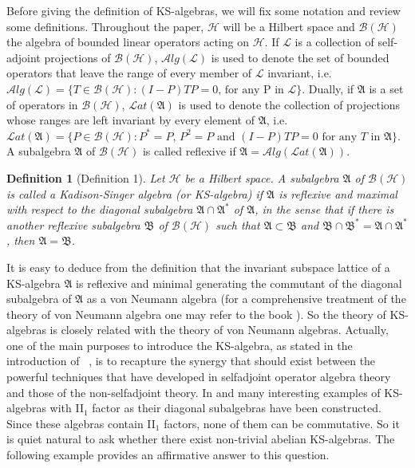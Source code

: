 \documentclass[a4paper,10pt]{amsart}
\newtheorem{definition}{Definition}[section]
\theoremstyle{refs}
\newcommand{\AAA}{\mathfrak A}
\newcommand{\BBB}{\mathcal B}
\newcommand{\HHH}{\mathcal H} %
\newcommand{\LLL}{\mathcal L} %
\newcommand{\Lat}{\mathcal Lat}
\newcommand{\Alg}{\mathcal Alg}
\begin{document}
Before giving the definition of KS-algebras, we will fix some notation
and review some definitions. Throughout the paper, $\HHH$ will
be a Hilbert space and $\BBB(\HHH)$
the algebra of bounded linear operators acting on $\HHH$. If $\LLL$ is
a collection of self-adjoint projections of $\BBB(\HHH)$,
$\Alg(\LLL)$ is used to denote the set of bounded operators
that leave the range of every member of $\LLL$ invariant,
i.e. $\Alg(\LLL) = \{ T \in \BBB(\HHH) : (I-P)TP = 0 \mbox{, for any P in } \LLL
\}$. Dually, if $\AAA$ is a set of operators in $\BBB(\HHH)$, $\Lat(\AAA)$
is used to denote the collection of projections whose ranges are left invariant
by every element of $\AAA$, i.e. $\Lat(\AAA) = \{ P \in \BBB(\HHH) :
P^* = P \mbox{, } P^2 = P \mbox{ and } (I-P)TP = 0 \mbox{ for any $T$ in $\AAA$} \}$.
A subalgebra $\AAA$ of $\BBB(\HHH)$ is called reflexive
if $\AAA = \Alg(\Lat(\AAA))$.

\begin{definition}[Definition 1\cite{GY1}] \label{def1}
Let $\HHH$ be a Hilbert space. A subalgebra $\AAA$ of $\BBB(\HHH)$ is called a Kadison-Singer
algebra (or
KS-algebra) if $\AAA$ is reflexive and maximal with respect to the diagonal
subalgebra $\AAA \cap \AAA^{*}$ of $\AAA$, in the sense that if there is another
reflexive subalgebra $\mathfrak{B}$ of $\BBB(\HHH)$ such that $\AAA \subset
\mathfrak{B}$ and $\mathfrak{B} \cap
\mathfrak{B}^{*}=\mathfrak{A}\cap\mathfrak{A}^*$, then $\AAA =
\mathfrak{B}$.
\end{definition}

It is easy to deduce from the definition that the invariant subspace
lattice of a KS-algebra $\AAA$ is reflexive and minimal generating the
commutant of the diagonal subalgebra of $\AAA$ as a von Neumann algebra
(for a comprehensive treatment of the theory of von Neumann algebra
one may refer to
the book \cite{Ka}). So the
theory of KS-algebras is closely related with the theory of von Neumann
algebras. Actually, one of the main purposes to introduce the
KS-algebra, as stated in the introduction of
~\cite{GY1}, is to recapture the synergy that should exist between the powerful
techniques that have
developed in selfadjoint operator algebra theory and those of
the
non-selfadjoint theory. In \cite{GY1} and \cite{GY2}
many interesting examples of KS-algebras with
II$_1$ factor as their diagonal subalgebras have been constructed.
Since these
algebras contain II$_1$ factors, none of them can be commutative.
So it is quiet natural to ask whether there exist non-trivial
abelian KS-algebras. The following example provides an affirmative answer to
this question.
\end{document}
